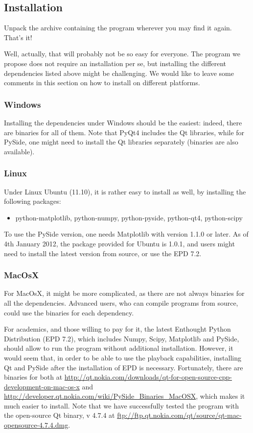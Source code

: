 \documentclass{article}
\begin{document}
\subsection{Installation}
Unpack the archive containing the program wherever you may find it again. That's it!

Well, actually, that will probably not be so easy for everyone. The program we propose does not require an installation per se, but installing the different dependencies listed above might be challenging. We would like to leave some comments in this section on how to install on different platforms.

\subsubsection{Windows}
Installing the dependencies under Windows should be the easiest: indeed, there are binaries for all of them. Note that PyQt4 includes the Qt libraries, while for PySide, one might need to install the Qt libraries separately (binaries are also available).

\subsubsection{Linux}
Under Linux Ubuntu (11.10), it is rather easy to install as well, by installing the following packages:
\begin{itemize}
\item python-matplotlib, python-numpy, python-pyside, python-qt4, python-scipy
\end{itemize}

To use the PySide version, one needs Matplotlib with version 1.1.0 or later. As of 4th January 2012, the package provided for Ubuntu is 1.0.1, and users might need to install the latest version from source, or use the EPD 7.2.

\subsubsection{MacOsX}
For MacOsX, it might be more complicated, as there are not always binaries for all the dependencies. Advanced users, who can compile programs from source, could use the binaries for each dependency. 

For academics, and those willing to pay for it, the latest Enthought Python Distribution (EPD 7.2), which includes Numpy, Scipy, Matplotlib and PySide, should allow to run the program without additional installation. However, it would seem that, in order to be able to use the playback capabilities, installing Qt and PySide after the installation of EPD is necessary. Fortunately, there are binaries for both at \url{http://qt.nokia.com/downloads/qt-for-open-source-cpp-development-on-mac-os-x} and \url{http://developer.qt.nokia.com/wiki/PySide_Binaries_MacOSX}, which makes it much easier to install. Note that we have successfully tested the program with the open-source Qt binary, v 4.7.4 at \url{ftp://ftp.qt.nokia.com/qt/source/qt-mac-opensource-4.7.4.dmg}.
\end{document}
